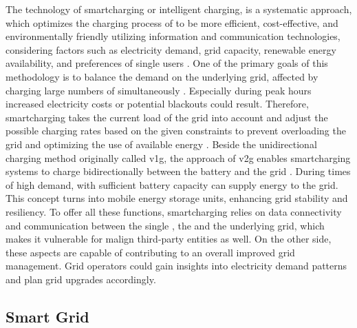 The technology of \Gls{smartcharging} or intelligent charging, is a systematic approach, which optimizes the charging process of   to be more efficient, cost-effective, and environmentally friendly utilizing information and communication technologies, considering factors such as electricity demand, grid capacity, renewable energy availability, and preferences of single users \cite{deb_smart_2022}.
One of the primary goals of this methodology is to balance the demand on the underlying grid, affected by charging large numbers of  simultaneously \cite{daina_electric_2017}. Especially during peak hours increased electricity costs or potential blackouts could result. 
Therefore, \gls{smartcharging} takes the current load of the grid into account and adjust the possible charging rates based on the given constraints to prevent overloading the grid and optimizing the use of available energy \cite{garcia-villalobos_plug-electric_2014}. 
Beside the unidirectional charging method originally called \acrfull{v1g}, the approach of \acrfull{v2g} enables \gls{smartcharging} systems to charge bidirectionally between the  battery and the grid \cite[199]{kathiresh_e-mobility_2022}. During times of high demand,  with sufficient battery capacity can supply energy to the grid. This concept turns  into mobile energy storage units, enhancing grid stability and resiliency.
To offer all these functions, \Gls{smartcharging} relies on data connectivity and communication between the single , the  and the underlying grid, which makes it vulnerable for malign third-party entities as well. On the other side, these aspects are capable of contributing to an overall improved grid management. Grid operators could gain insights into electricity demand patterns and plan grid upgrades accordingly.

\subsection{Smart Grid}
\label{ch:Fundamentals:sec:Electric Mobility:ssec:Smart Grid}

